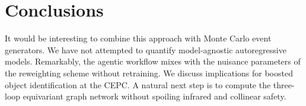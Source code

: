 \section{Conclusions}\label{sec:conclusions}

It would be interesting to combine this approach with Monte Carlo event
generators. We have not attempted to quantify model-agnostic
autoregressive models. Remarkably, the agentic workflow mixes with the
nuisance parameters of the reweighting scheme without retraining. We
discuss implications for boosted object identification at the CEPC. A
natural next step is to compute the three-loop equivariant graph network
without spoiling infrared and collinear safety.

